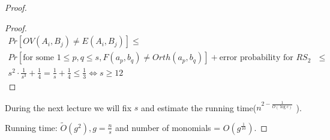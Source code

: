 \begin{proof}
\begin{lm}
\begin{lm}
		\end{lm}

		\begin{proof}
			\begin{align*}
				Pr[OV(A_i, B_j) \neq E(A_i, B_j)] \leq \\ Pr[\text{for some }1 \leq p, q \leq s, F(a_p, b_q) \neq Orth(a_p, b_q)] + \text{error probability for $RS_2$ } \leq \\ s^2 \cdot \frac{1}{s^3} + \frac{1}{4} = \frac{1}{s} + \frac{1}{4} \leq \frac{1}{3} \Leftrightarrow s \geq 12
			\end{align*}
		\end{proof}



	\end{lm}


	During the next lecture we will fix $s$ and estimate the running time($n^{2-\frac{1}{O(\log c)}}$ ).

	Running time: $\widetilde{O}(g^2), g=\frac{n}{s}$ and number of monomials = $O(g^{\frac{1}{10}})$.


\end{proof}
